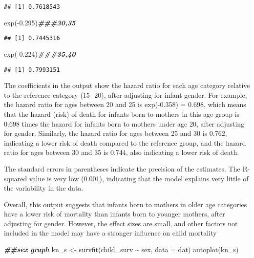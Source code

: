 \documentclass[
]{article}
\newenvironment{Shaded}{\begin{snugshade}}{\end{snugshade}}
\newcommand{\AttributeTok}[1]{\textcolor[rgb]{0.77,0.63,0.00}{#1}}
\newcommand{\DocumentationTok}[1]{\textcolor[rgb]{0.56,0.35,0.01}{\textbf{\textit{#1}}}}
\newcommand{\FloatTok}[1]{\textcolor[rgb]{0.00,0.00,0.81}{#1}}
\newcommand{\FunctionTok}[1]{\textcolor[rgb]{0.00,0.00,0.00}{#1}}
\newcommand{\NormalTok}[1]{#1}
\newcommand{\OtherTok}[1]{\textcolor[rgb]{0.56,0.35,0.01}{#1}}
\newcommand{\SpecialCharTok}[1]{\textcolor[rgb]{0.00,0.00,0.00}{#1}}
\begin{document}
\begin{verbatim}
## [1] 0.7618543
\end{verbatim}

\begin{Shaded}
\begin{Highlighting}[]
\FunctionTok{exp}\NormalTok{(}\SpecialCharTok{{-}}\FloatTok{0.295}\NormalTok{)}\DocumentationTok{\#\#\#30,35 }
\end{Highlighting}
\end{Shaded}

\begin{verbatim}
## [1] 0.7445316
\end{verbatim}

\begin{Shaded}
\begin{Highlighting}[]
\FunctionTok{exp}\NormalTok{(}\SpecialCharTok{{-}}\FloatTok{0.224}\NormalTok{)}\DocumentationTok{\#\#\#35,40 }
\end{Highlighting}
\end{Shaded}

\begin{verbatim}
## [1] 0.7993151
\end{verbatim}

The coefficients in the output show the hazard ratio for each age
category relative to the reference category (15- 20), after adjusting
for infant gender. For example, the hazard ratio for ages between 20 and
25 is exp(-0.358) = 0.698, which means that the hazard (risk) of death
for infants born to mothers in this age group is 0.698 times the hazard
for infants born to mothers under age 20, after adjusting for gender.
Similarly, the hazard ratio for ages between 25 and 30 is 0.762,
indicating a lower risk of death compared to the reference group, and
the hazard ratio for ages between 30 and 35 is 0.744, also indicating a
lower risk of death.

The standard errors in parentheses indicate the precision of the
estimates. The R-squared value is very low (0.001), indicating that the
model explains very little of the variability in the data.

Overall, this output suggests that infants born to mothers in older age
categories have a lower risk of mortality than infants born to younger
mothers, after adjusting for gender. However, the effect sizes are
small, and other factors not included in the model may have a stronger
influence on child mortality

\begin{Shaded}
\begin{Highlighting}[]
\DocumentationTok{\#\#sex graph}
\NormalTok{kn\_s }\OtherTok{\textless{}{-}} \FunctionTok{survfit}\NormalTok{(child\_surv }\SpecialCharTok{\textasciitilde{}}\NormalTok{ sex, }\AttributeTok{data =}\NormalTok{ dat)}
\FunctionTok{autoplot}\NormalTok{(kn\_s)}
\end{Highlighting}
\end{Shaded}
\end{document}
